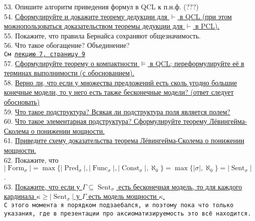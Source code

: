 \documentclass[a4paper,100pt]{article}
\theoremstyle{indented}
\theoremstyle{definition}
\theoremstyle{remark}
\DeclareMathOperator{\form}{Form}
\DeclareMathOperator{\Pred}{Pred}
\DeclareMathOperator{\Func}{Func}
\DeclareMathOperator{\Const}{Const}
\DeclareMathOperator{\Sent}{Sent}
\begin{document}
53. %
{Опишите алгоритм приведения формул в QCL к п.н.ф. (???)} \\ 

54. \hyperlink{b54}{Сформулируйте и докажите теорему дедукции для $\vdash$ в QCL (при этом можнопользоваться доказательством теоремы дедукции для $\vdash$ в PCL).} \\

55. %
{Покажите, что правила Бернайса сохраняют общезначимость.} \\ 

56. %
{Что такое обогащение? Объединение?} \\ 

\texttt{См \href{http://www.mi-ras.ru/~speranski/courses/logic-1-2021-spring/slides_7.pdf}{лекцию 7, страницу 9}} \\

57. \hyperlink{b57}{Сформулируйте теорему о компактности $\vDash$ в QCL; переформулируйте её в терминах выполнимости (с обоснованием).} \\

58. \hyperlink{b58}{Верно ли, что если у множества предложений есть сколь угодно большие конечные модели, то у него есть также бесконечные модели? (ответ следует обосновать)} \\

59. \hyperlink{b59}{Что такое подструктура? Всякая ли подструктура поля является полем?} \\

60. \hyperlink{b60}{Что такое элементарная подструктура? Сформулируйте теорему Лёвингейма-Сколема о понижении мощности.} \\ 

61. \hyperlink{b61}{Приведите схему доказательства теорема Лёвингейма-Сколема о понижении мощности.} \\

62. %
{Покажите, что $|\form_\sigma|=\max \{|\Pred_\sigma|, |\Func_\sigma|, |\Const_\sigma|, \aleph_0\} = \max\{|\sigma|, \aleph_0\}=|\Sent_\sigma|$.} \\

63. \hyperlink{b63}{Покажите, что если у $\Gamma \subseteq \Sent_\sigma$ есть бесконечная модель, то для каждого кардинала $\kappa \geq |\Sent_\sigma|$ у $\Gamma$ есть модель мощности $\kappa$.} \\

\texttt{С этого момента я порядком подзаебался, и поэтому пока что только указания, где в презентации про аксиоматизируемость это всё находится.} \\
\end{document}
